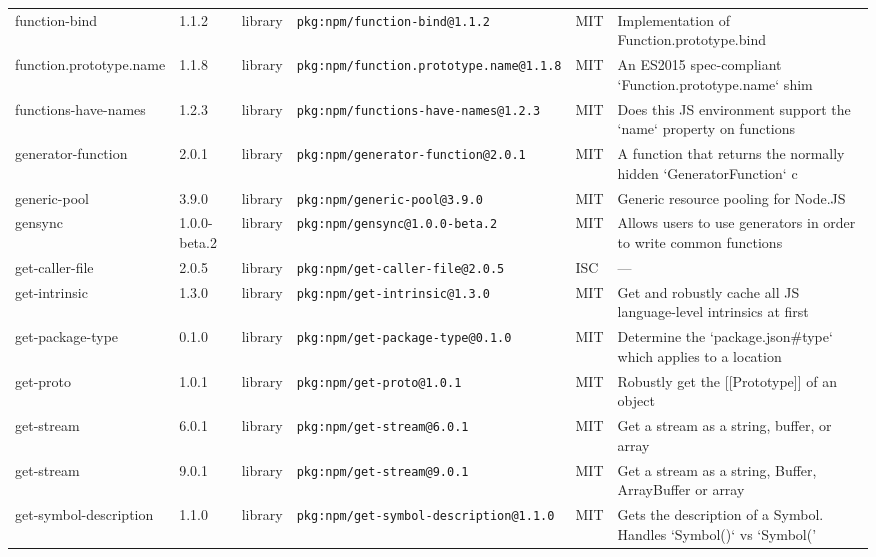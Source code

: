 \documentclass[11pt,a4paper]{article}
\begin{document}
\begin{longtable}{|p{4cm}|p{2cm}|p{1.6cm}|p{5cm}|p{1.5cm}|p{3.5cm}|}
\raggedright function-bind & 1.1.2 & library & \small\texttt{pkg:npm/function-bind@1.1.2} & MIT & \small Implementation of Function.prototype.bind \\
\raggedright function.prototype.name & 1.1.8 & library & \small\texttt{pkg:npm/function.prototype.name@1.1.8} & MIT & \small An ES2015 spec-compliant `Function.prototype.name` shim \\
\raggedright functions-have-names & 1.2.3 & library & \small\texttt{pkg:npm/functions-have-names@1.2.3} & MIT & \small Does this JS environment support the `name` property on functions \\
\raggedright generator-function & 2.0.1 & library & \small\texttt{pkg:npm/generator-function@2.0.1} & MIT & \small A function that returns the normally hidden `GeneratorFunction` c \\
\raggedright generic-pool & 3.9.0 & library & \small\texttt{pkg:npm/generic-pool@3.9.0} & MIT & \small Generic resource pooling for Node.JS \\
\raggedright gensync & 1.0.0-beta.2 & library & \small\texttt{pkg:npm/gensync@1.0.0-beta.2} & MIT & \small Allows users to use generators in order to write common functions \\
\raggedright get-caller-file & 2.0.5 & library & \small\texttt{pkg:npm/get-caller-file@2.0.5} & ISC & \small — \\
\raggedright get-intrinsic & 1.3.0 & library & \small\texttt{pkg:npm/get-intrinsic@1.3.0} & MIT & \small Get and robustly cache all JS language-level intrinsics at first  \\
\raggedright get-package-type & 0.1.0 & library & \small\texttt{pkg:npm/get-package-type@0.1.0} & MIT & \small Determine the `package.json\#type` which applies to a location \\
\raggedright get-proto & 1.0.1 & library & \small\texttt{pkg:npm/get-proto@1.0.1} & MIT & \small Robustly get the [[Prototype]] of an object \\
\raggedright get-stream & 6.0.1 & library & \small\texttt{pkg:npm/get-stream@6.0.1} & MIT & \small Get a stream as a string, buffer, or array \\
\raggedright get-stream & 9.0.1 & library & \small\texttt{pkg:npm/get-stream@9.0.1} & MIT & \small Get a stream as a string, Buffer, ArrayBuffer or array \\
\raggedright get-symbol-description & 1.1.0 & library & \small\texttt{pkg:npm/get-symbol-description@1.1.0} & MIT & \small Gets the description of a Symbol. Handles `Symbol()` vs `Symbol(' \\

\end{longtable}
\end{document}
